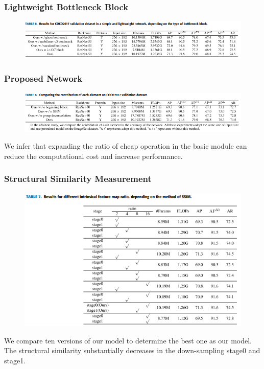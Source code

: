 \documentclass[11pt]{article}
\begin{document}
\subsubsection{Lightweight Bottleneck Block}
\begin{figure}[H]
	\centering
	\includegraphics[scale = 0.55]{86}
\end{figure}
\subsubsection{Proposed Network}
\begin{figure}[H]
	\centering
	\includegraphics[scale = 0.55]{87}
\end{figure}

We infer that expanding the ratio of cheap operation in the basic module can reduce the computational cost and increase performance.
\subsubsection{Structural Similarity Measurement}
\begin{figure}[H]
	\centering
	\includegraphics[scale = 0.7]{88}
\end{figure}
We compare ten versions of our model to determine the best one as our model. The structural similarity substantially decreases in the down-sampling stage0 and stage1.
\end{document}
